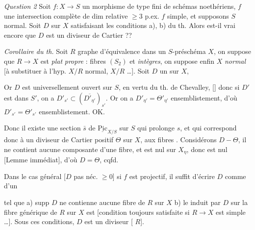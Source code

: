 \documentclass[11pt,a4paper]{article}
\begin{document}
\emph{Question 2} Soit $f\colon X\to S$ un morphisme \struck{\ill{}} de type fini de schémas
 noethériens, $f$ \struck{\ill{}} une intersection complète
 de dim relative $\geq 3$  p.ex. $f$ simple, et supposons
$S$  normal. Soit $D$ sur $X$ satisfaisant les conditions a), b) du th.
Alors est-il vrai encore que $D$ est un diviseur de Cartier ??

\emph{Corollaire du th.} Soit $R$ graphe d'équivalence  dans un
$S$-préschéma $X$, on suppose que $R\to X$ est \emph{plat} \emph{propre} : fibres
 $(S_2)$ et \emph{intègres}, on suppose enfin $X$ \emph{normal}
 \struck{\ill{}} [à substituer à l'hyp. $X/R$ normal, $X/R$ \ill{}
\ill{} …]. Soit $D$ un   sur $X$,


Or \struck{\ill{}} $D$  est universellement ouvert sur $S$, en vertu du th. de Chevalley, [\ill{}]
donc si $D'$ est \ill{} \ill{} \ill{} dans $S'$, on a
$D'_{s'}\subset(\overline{D'_{\eta'}})_{s'}$. Or on a $D'_{\eta'}=\Theta'_{\eta'}$
ensemblistement, d'où $D'_{s'}=\Theta'_{s'}$ ensemblistement. OK.

Donc il existe une  section $\bar{s}$ de $\underline{\mathrm{Pic}}_{X/S}$
sur $S$ qui prolonge $s$, et qui correspond donc à un diviseur  de Cartier
positif $\Theta$ sur $X$,  aux fibres . \struck{$\Theta_\eta=$} Considérons $D-\Theta$, il  ne contient aucune composante d'une fibre, et est nul sur $X_\eta$, donc est nul
[Lemme immédiat], d'où $D=\Theta$, cqfd.

Dans le cas général [$D$ pas néc. $\geq 0$] si $f$ est projectif, il suffit d'écrire $D$
comme \struck{\ill{}}  \ill{} d'un

tel que  a) supp $D$ ne contienne aucune fibre de $R$ sur $X$ b) le
  induit par $D$ sur la fibre générique de $R$ sur $X$ est
  [condition toujours satisfaite si $R\to X$ est simple
…]. Sous ces conditions, $D$ est un diviseur \struck{\ill{}} \ill{}
[\ill{} \ill{} \ill{} \ill{} $R$].
\end{document}

